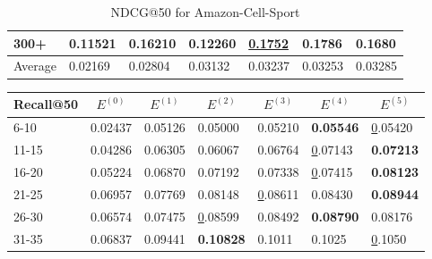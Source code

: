 \begin{table*}[]
\begin{tabular}{|l|l|l|l|l|l|l|}
    300+    & 0.11521                        & 0.16210                        & 0.12260                        & \underline{0.1752}             & \textbf{0.1786}                & 0.1680                         \\ \hline
    Average & 0.02169                        & 0.02804                        & 0.03132                        & 0.03237                        & 0.03253                        & 0.03285                        \\ \hline   
    \end{tabular}
    \caption{NDCG@50 for Amazon-Cell-Sport}
    \label{tab:Amazon-Cell-Sport-ndcg-evaluation}
\end{table*}
\begin{table*}[]
    \begin{tabular}{|l|l|l|l|l|l|l|}
    \hline
    Recall@50 & \multicolumn{1}{c|}{$E^{(0)}$} & \multicolumn{1}{c|}{$E^{(1)}$} & \multicolumn{1}{c|}{$E^{(2)}$} & \multicolumn{1}{c|}{$E^{(3)}$} & \multicolumn{1}{c|}{$E^{(4)}$} & \multicolumn{1}{c|}{$E^{(5)}$} \\ \hline
    6-10      & 0.02437                        & 0.05126                        & 0.05000                        & 0.05210                        & \textbf{0.05546}               & {\ul 0.05420}                  \\ \hline
    11-15     & 0.04286                        & 0.06305                        & 0.06067                        & 0.06764                        & {\ul 0.07143}                  & \textbf{0.07213}               \\ \hline
    16-20     & 0.05224                        & 0.06870                        & 0.07192                        & 0.07338                        & {\ul 0.07415}                  & \textbf{0.08123}               \\ \hline
    21-25     & 0.06957                        & 0.07769                        & 0.08148                        & {\ul 0.08611}                  & 0.08430                        & \textbf{0.08944}               \\ \hline
    26-30     & 0.06574                        & 0.07475                        & {\ul 0.08599}                  & 0.08492                        & \textbf{0.08790}               & 0.08176                        \\ \hline
    31-35     & 0.06837                        & 0.09441                        & \textbf{0.10828}               & 0.1011                         & 0.1025                         & {\ul 0.1050}                   \\ \hline

\end{tabular}
\end{table*}
